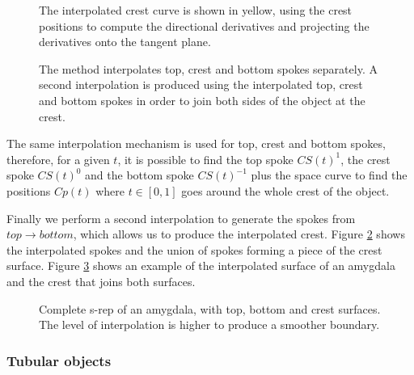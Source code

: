 \begin{figure} 
 \centering  
 \caption[Interpolated crest curve.]{The interpolated crest curve is shown in yellow, using the crest positions to compute the directional derivatives and projecting the derivatives onto the tangent plane.}
 \label{fig:crestCurve}  
\end{figure}

\begin{figure} 
 \centering  
 \caption[Slab's surfaces interpolation.]{The method interpolates top, crest and bottom spokes separately. 
	  A second interpolation is produced using the interpolated top, crest and bottom spokes in order to
	  join both sides of the object at the crest.}
 \label{fig:crestSpokes}  
\end{figure}

The same interpolation mechanism is used for top, crest and bottom spokes,
therefore, for a given $t$, 
it is possible to find the top spoke $CS(t)^1$, the crest spoke $CS(t)^0$ and the bottom spoke $CS(t)^{-1}$ 
plus the space curve to find the positions $Cp(t)$ where $t \in [0, 1]$ goes around 
the whole crest of the object. 

Finally we perform a second interpolation to generate the spokes from $top \rightarrow bottom$, which allows
us to produce the interpolated crest. 
Figure \ref{fig:crestSpokes} shows the interpolated spokes and the union of spokes forming a piece of the crest surface.
Figure \ref{fig:srepInterpolated} shows an example of the interpolated surface 
of an amygdala and the crest that joins both surfaces.

\begin{figure} 
 \centering  
 \caption[Amygdala's s-rep.]{Complete s-rep of an amygdala, with top, bottom and crest surfaces. 
          The level of interpolation is higher to produce a smoother boundary.}
 \label{fig:srepInterpolated}  
\end{figure}

\subsubsection{Tubular objects} 

